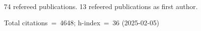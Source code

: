 74 refereed publications. 13 refeered publications as first author.

Total citations~=~4648; h-index~=~36 (2025-02-05)